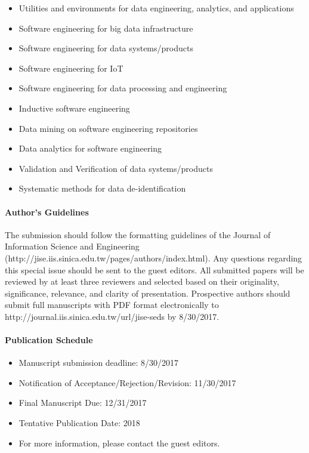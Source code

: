 \documentclass[12pt,oneside,a4paper]{book}
\begin{document}
\begin{itemize}
\item Utilities and environments for data engineering, analytics, and applications
\item Software engineering for big data infrastructure 
\item Software engineering for data systems/products
\item Software engineering for IoT 
\item Software engineering for data processing and engineering
\item Inductive software engineering 
\item Data mining on software engineering repositories
\item Data analytics for software engineering 
\item Validation and Verification of data systems/products
\item Systematic methods for data de-identification 
\end{itemize}

\paragraph{Author’s Guidelines} The submission should follow the formatting guidelines of the Journal of Information Science and Engineering (http://jise.iis.sinica.edu.tw/pages/authors/index.html). Any questions regarding this special issue should be sent to the guest editors. All submitted papers will be reviewed by at least three reviewers and selected based on their originality, significance, relevance, and clarity of presentation. Prospective authors should submit full manuscripts with PDF format electronically to http://journal.iis.sinica.edu.tw/url/jise-seds by 8/30/2017.

\paragraph{Publication Schedule}
\begin{itemize}
\item Manuscript submission deadline: 8/30/2017
\item Notification of Acceptance/Rejection/Revision: 11/30/2017
\item Final Manuscript Due: 12/31/2017
\item Tentative Publication Date: 2018
\item For more information, please contact the guest editors.
\end{itemize}
\end{document}
